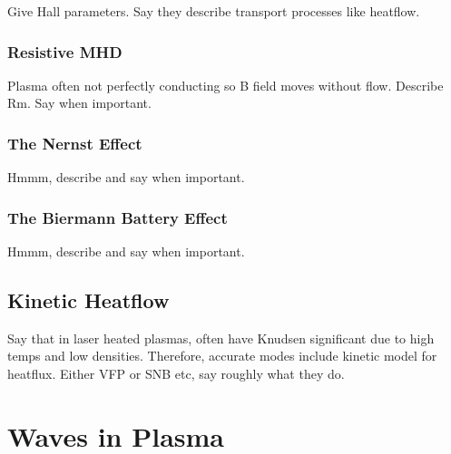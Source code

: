Give Hall parameters.
Say they describe transport processes like heatflow.

\subsubsection{Resistive MHD}%
\label{sec:theory_resisMHD}

Plasma often not perfectly conducting so B field moves without flow.
Describe Rm.
Say when important.

\subsubsection{The Nernst Effect}%
\label{sec:theory_resisMHD}

Hmmm, describe and say when important.

\subsubsection{The Biermann Battery Effect}%
\label{sec:theory_biermann}

Hmmm, describe and say when important.

\subsection{Kinetic Heatflow}%
\label{sec:theory_kineticheatflow}

Say that in laser heated plasmas, often have Knudsen significant due to high temps and low densities.
Therefore, accurate modes include kinetic model for heatflux.
Either VFP or SNB etc, say roughly what they do.

\section{Waves in Plasma}%
\label{sec:theory_waves_plasmas}

